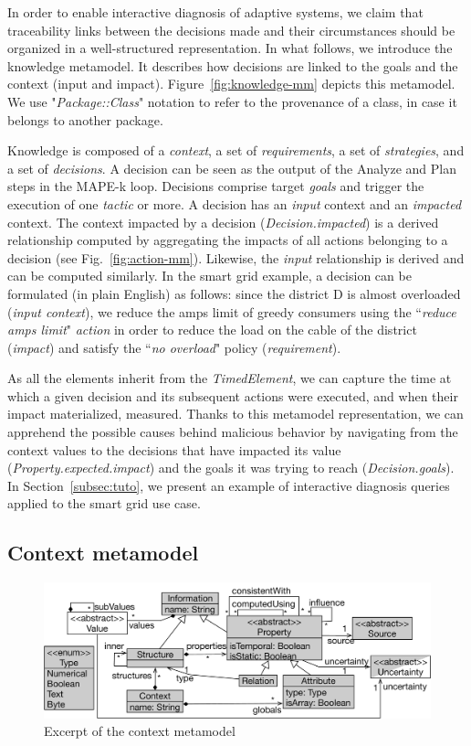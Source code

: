 In order to enable interactive diagnosis of adaptive systems, we claim that traceability links between the decisions made and their circumstances should be organized in a well-structured representation.  In what follows, we introduce the knowledge metamodel. It describes how decisions are linked to the goals and the context (input and impact). Figure~\ref{fig:knowledge-mm} depicts this metamodel. We use "\textit{Package::Class}" notation to refer to the provenance of a class, in case it belongs to another package. 

Knowledge is composed of a \textit{context}, a set of \textit{requirements}, a set of \textit{strategies}, and a set of \textit{decisions}.  A decision can be seen as the output of the Analyze and Plan steps in the MAPE-k loop. Decisions comprise target \textit{goals} and trigger the execution of one \textit{tactic} or more.  A decision has an \textit{input} context and an \textit{impacted} context.  The context impacted by a decision  (\textit{Decision.impacted}) is a derived relationship computed by aggregating the impacts of all actions belonging to a decision (see Fig.~\ref{fig:action-mm}).  Likewise, the \textit{input} relationship is derived and can be computed similarly. In the smart grid example, a decision can be formulated (in plain English) as follows: since the district D is almost overloaded (\textit{input context}), we reduce the amps limit of greedy consumers using the ``\textit{reduce amps limit}" \textit{action} in order to reduce the load on the cable of the district (\textit{impact}) and satisfy the ``\textit{no overload}" policy (\textit{requirement}).

As all the elements inherit from the \textit{TimedElement}, we can capture the time at which a given decision and its subsequent actions were executed, and when their impact materialized, \ie measured. Thanks to this metamodel representation, we can apprehend the possible causes behind malicious behavior by navigating from the context values to the decisions that have impacted its value (\textit{Property.expected.impact}) and the goals it was trying to reach (\textit{Decision.goals}). In Section~\ref{subsec:tuto}, we present an example of interactive diagnosis queries applied to the smart grid use case.

\subsection{Context metamodel}
\begin{figure}
  \begin{center}
      \includegraphics[width=.65\linewidth]{img/chapt-tkm/mm/contextModel}
      \caption{Excerpt of the context metamodel}
      \label{fig:context-model}
  \end{center}	
\end{figure}

